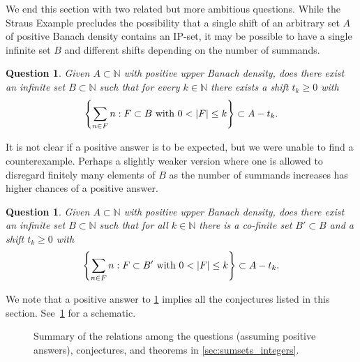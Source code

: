 \documentclass[10pt,dvipsnames]{article}
\newtheorem{question}[theorem]{Question}
\theoremstyle{definition}
\theoremstyle{plain}
\newcommand{\N}{\mathbb{N}}
\begin{document}
We end this section with two related but more ambitious questions. 
While the Straus Example precludes the possibility that a single shift of an arbitrary set $A$ of positive Banach density contains an IP-set, it may be possible to have a single infinite set $B$ and different shifts depending on the number of summands.

\begin{question}\label{question_motherHindman}
Given $A\subset\N$ with positive upper Banach density, does there exist an infinite set $B \subset\N$ such that for every $k\in\N$ there exists a shift $t_k\geq0$ with
\[\left\{ \sum_{n \in F}  n :   F \subset B\textup{ with } 0< |F| \leq k \right\}\subset A-t_k. \]
\end{question}
It is not clear if a positive answer is to be expected, but we were unable to find a counterexample.
Perhaps a slightly weaker version where one is allowed to disregard finitely many elements of $B$ as the number of summands increases has higher chances of a positive answer.
\begin{question}\label{question_sameB}
Given $A\subset\N$ with positive upper Banach density, does there exist an infinite set $B \subset\N$ such that for all $k\in\N$ there is a co-finite set $B'\subset B$ and a shift $t_k\geq0$ with
\[\left\{ \sum_{n \in F}  n :   F \subset B'\textup{ with } 0< |F| \leq k \right\}\subset A-t_k. 
\]
\end{question}

We note that a positive answer to \cref{question_motherHindman} implies all the conjectures listed in this section. See~\cref{fig:diagram} for a schematic.




\begin{figure}[h!]
\centering
{}
\caption{Summary of the relations among the questions (assuming positive answers), conjectures,  and theorems in \cref{sec:sumsets_integers}.}
\label{fig:diagram}
\end{figure}
\end{document}
